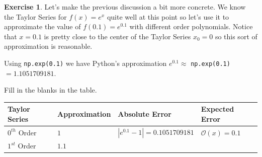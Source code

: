 \documentclass[
]{book}
\theoremstyle{definition}
\theoremstyle{definition}
\theoremstyle{definition}
\newtheorem{exercise}{Exercise}[chapter]
\theoremstyle{remark}
\begin{document}
\begin{exercise}
\protect\hypertarget{exr:unnamed-chunk-47}{}{\label{exr:unnamed-chunk-47} }Let's make the previous discussion a bit more concrete. We know the Taylor Series for \(f(x) = e^x\) quite well at this point so let's use it to approximate the value of \(f(0.1) = e^{0.1}\) with different order polynomials. Notice that \(x=0.1\) is pretty close to the center of the Taylor Series \(x_0 = 0\) so this sort of approximation is reasonable.

Using \texttt{np.exp(0.1)} we have Python's approximation \(e^{0.1} \approx\) \texttt{np.exp(0.1)} \(=1.1051709181\).

Fill in the blanks in the table.

\begin{longtable}[]{@{}llll@{}}
\toprule
\begin{minipage}[b]{0.23\columnwidth}\raggedright
Taylor Series\strut
\end{minipage} & \begin{minipage}[b]{0.23\columnwidth}\raggedright
Approximation\strut
\end{minipage} & \begin{minipage}[b]{0.23\columnwidth}\raggedright
Absolute Error\strut
\end{minipage} & \begin{minipage}[b]{0.19\columnwidth}\raggedright
Expected Error\strut
\end{minipage}\tabularnewline
\midrule
\endhead
\begin{minipage}[t]{0.23\columnwidth}\raggedright
\(0^{th}\) Order\strut
\end{minipage} & \begin{minipage}[t]{0.23\columnwidth}\raggedright
\(1\)\strut
\end{minipage} & \begin{minipage}[t]{0.23\columnwidth}\raggedright
\(|e^{0.1}-1| = 0.1051709181\)\strut
\end{minipage} & \begin{minipage}[t]{0.19\columnwidth}\raggedright
\(\mathcal{O}(x) = 0.1\)\strut
\end{minipage}\tabularnewline
\begin{minipage}[t]{0.23\columnwidth}\raggedright
\(1^{st}\) Order\strut
\end{minipage} & \begin{minipage}[t]{0.23\columnwidth}\raggedright
\(1.1\)\strut
\end{minipage} & \begin{minipage}[t]{0.23\columnwidth}\raggedright

\end{minipage}
\end{longtable}
\end{exercise}
\end{document}
